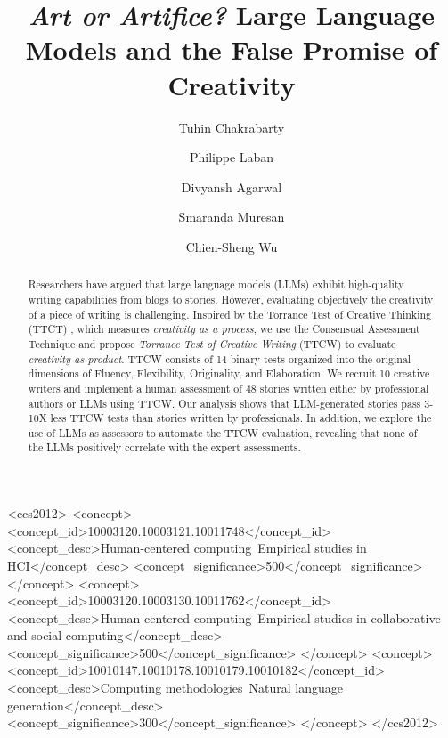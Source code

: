 \documentclass[sigconf]{acmart}
\begin{document}
\title{\textit{Art or Artifice?} Large Language Models and the False Promise of Creativity}


\author{Tuhin Chakrabarty}

\author{Philippe Laban}


\author{Divyansh Agarwal}

\author{Smaranda Muresan}

\author{Chien-Sheng Wu}

\renewcommand{\shortauthors}{Chakrabarty, et al.}


\begin{abstract}
Researchers have argued that large language models (LLMs) exhibit high-quality writing capabilities from blogs to stories. However, evaluating objectively the creativity of a piece of writing is challenging. Inspired by the Torrance Test of Creative Thinking (TTCT) \cite{torrance1966torrance}, which measures \textit{creativity as a process}, we use the Consensual Assessment Technique \cite{amabile1982social} and propose \textit{Torrance Test of Creative Writing} (TTCW) to evaluate \textit{creativity as product}. TTCW consists of 14 binary tests organized into the original dimensions of Fluency, Flexibility, Originality, and Elaboration. We recruit 10 creative writers and implement a human assessment of 48 stories written either by professional authors or LLMs using TTCW. Our analysis shows that LLM-generated stories pass 3-10X less TTCW tests than stories written by professionals. In addition, we explore the use of LLMs as assessors to automate the TTCW evaluation, revealing that none of the LLMs positively correlate with the expert assessments.\end{abstract}

\begin{CCSXML}
<ccs2012>
   <concept>
       <concept_id>10003120.10003121.10011748</concept_id>
       <concept_desc>Human-centered computing~Empirical studies in HCI</concept_desc>
       <concept_significance>500</concept_significance>
       </concept>
   <concept>
       <concept_id>10003120.10003130.10011762</concept_id>
       <concept_desc>Human-centered computing~Empirical studies in collaborative and social computing</concept_desc>
       <concept_significance>500</concept_significance>
       </concept>
   <concept>
       <concept_id>10010147.10010178.10010179.10010182</concept_id>
       <concept_desc>Computing methodologies~Natural language generation</concept_desc>
       <concept_significance>300</concept_significance>
       </concept>
 </ccs2012>
\end{CCSXML}
\end{document}
